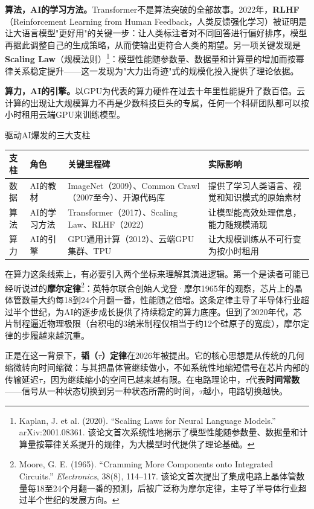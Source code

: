 \textbf{算法，AI的学习方法。}Transformer不是算法突破的全部故事。2022年，\textbf{RLHF}（Reinforcement Learning from Human Feedback，人类反馈强化学习）被证明是让大语言模型"更好用"的关键一步：让人类标注者对不同回答进行偏好排序，模型再据此调整自己的生成策略，从而使输出更符合人类的期望。另一项关键发现是\textbf{Scaling Law}（规模法则）\footnote{Kaplan, J. et al. (2020). ``Scaling Laws for Neural Language Models.'' arXiv:2001.08361. 该论文首次系统性地揭示了模型性能随参数量、数据量和计算量按幂律关系提升的规律，为大模型时代提供了理论基础。}：模型性能随参数量、数据量和计算量的增加而按幂律关系稳定提升——这一发现为"大力出奇迹"式的规模化投入提供了理论依据。

\textbf{算力，AI的引擎。}以GPU为代表的算力硬件在过去十年里性能提升了数百倍。云计算的出现让大规模算力不再是少数科技巨头的专属，任何一个科研团队都可以按小时租用云端GPU来训练模型。

\begin{formalTable}
\caption{驱动AI爆发的三大支柱}
\label{tab:ch1_03}
\begin{tabularx}{\textwidth}{@{}YYYY@{}}
\toprule
\textbf{支柱} & \textbf{角色} & \textbf{关键里程碑} & \textbf{实际影响} \\
\midrule
数据 & AI的教材 & ImageNet（2009）、Common Crawl（2007至今）、开源代码库 & 提供了学习人类语言、视觉和知识模式的原始素材 \\
算法 & AI的学习方法 & Transformer（2017）、Scaling Law、RLHF（2022） & 让模型能高效处理信息，能力随规模涌现 \\
算力 & AI的引擎 & GPU通用计算（2012）、云端GPU集群、TPU & 让大规模训练从不可行变为按小时租用 \\
\bottomrule
\end{tabularx}
\end{formalTable}

在算力这条线索上，有必要引入两个坐标来理解其演进逻辑。第一个是读者可能已经听说过的\textbf{摩尔定律}\footnote{Moore, G. E. (1965). ``Cramming More Components onto Integrated Circuits.'' \emph{Electronics}, 38(8), 114--117. 该论文首次提出了集成电路上晶体管数量每18至24个月翻一番的预测，后被广泛称为摩尔定律，主导了半导体行业超过半个世纪的发展方向。}：英特尔联合创始人戈登·摩尔1965年的观察，芯片上的晶体管数量大约每18到24个月翻一番，性能随之倍增。这条定律主导了半导体行业超过半个世纪，为AI的逐步成长提供了持续稳定的算力底座。但到了2020年代，芯片制程逼近物理极限（台积电的3纳米制程仅相当于约12个硅原子的宽度），摩尔定律的步履越来越沉重。

正是在这一背景下，\textbf{韬（$\tau$）定律}在2026年被提出。它的核心思想是从传统的几何缩微转向时间缩微：与其把晶体管继续做小，不如系统性地缩短信号在芯片内部的传输延迟$\tau$，因为继续缩小的空间已越来越有限。在电路理论中，$\tau$代表\textbf{时间常数}——信号从一种状态切换到另一种状态所需的时间，$\tau$越小，电路切换越快。


